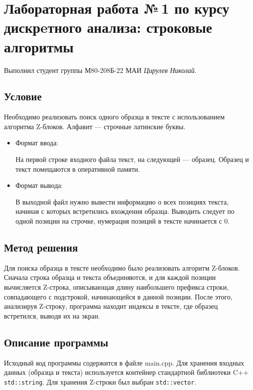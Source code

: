 \documentclass[12pt]{article}
\begin{document}
\section*{Лабораторная работа №\,1 по курсу дискрeтного анализа: строковые алгоритмы}

Выполнил студент группы М80-208Б-22 МАИ \textit{Цирулев Николай}.

\subsection*{Условие}

Необходимо реализовать поиск одного образца в тексте с использованием алгоритма Z-блоков. Алфавит — строчные латинские буквы. 
\begin{itemize}
\item
    Формат ввода:
    
    На первой строке входного файла текст, на следующей — образец. Образец и текст помещаются в оперативной памяти.

\item
    Формат вывода:
    
    В выходной файл нужно вывести информацию о всех позициях текста, начиная с которых встретились вхождения образца. Выводить следует по одной позиции на строчке, нумерация позиций в тексте начинается с 0. 
\end{itemize}

\subsection*{Метод решения}

Для поиска образца в тексте необходимо было реализовать алгоритм Z-блоков. Сначала строка образца и текста объединяются, и для каждой позиции вычисляется Z-строка, описывающая длину наибольшего префикса строки, совпадающего с подстрокой, начинающейся в данной позиции. После этого, анализируя Z-строку, программа находит индексы в тексте, где образец встретился, выводя их на экран.

\subsection*{Описание программы}

Исходный код программы содержится в файле main.cpp. Для хранения входных данных (образца и текста) используется контейнер стандартной библиотеки C++ \texttt{std::string}. Для хранения Z-строки был выбран \texttt{std::vector}.
\end{document}
